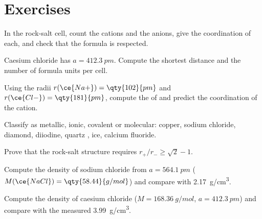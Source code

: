 \section{Exercises}

\begin{exercise}[$\star$]\label{exo:b1:crystals-ionic-covalent:1}
In the rock-salt cell, count the cations and the anions, give the
coordination of each, and check that the formula  is respected.
\end{exercise}

\begin{exercise}[$\star$]\label{exo:b1:crystals-ionic-covalent:2}
Caesium chloride has $a = \qty{412.3}{pm}$. Compute the shortest
 distance and the number of formula units per cell.
\end{exercise}

\begin{exercise}[$\star$]\label{exo:b1:crystals-ionic-covalent:3}
Using the radii $r(\ce{Na+}) = \qty{102}{pm}$ and $r(\ce{Cl-}) =
\qty{181}{pm}$, compute the  of  and predict the
coordination of the cation.
\end{exercise}

\begin{exercise}[$\star$]\label{exo:b1:crystals-ionic-covalent:4}
Classify as metallic, ionic, covalent or molecular: copper, sodium
chloride, diamond, diiodine, quartz , ice, calcium fluoride.
\end{exercise}

\begin{exercise}[$\star\star$]\label{exo:b1:crystals-ionic-covalent:5}
Prove that the rock-salt structure requires $r_+/r_- \ge \sqrt2 - 1$.
\end{exercise}

\begin{exercise}[$\star\star$]\label{exo:b1:crystals-ionic-covalent:6}
Compute the density of sodium chloride from $a = \qty{564.1}{pm}$
($M(\ce{NaCl}) = \qty{58.44}{g/mol}$) and compare with
\qty{2.17}{g/cm^3}.
\end{exercise}

\begin{exercise}[$\star\star$]\label{exo:b1:crystals-ionic-covalent:7}
Compute the density of caesium chloride ($M = \qty{168.36}{g/mol}$,
$a = \qty{412.3}{pm}$) and compare with the measured \qty{3.99}{g/cm^3}.
\end{exercise}

